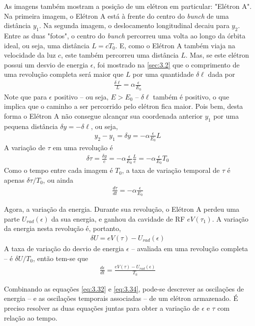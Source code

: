 As imagens também mostram a posição de um elétron em particular: "Elétron A". Na primeira imagem, o Elétron A está à frente do centro do \textit{bunch} de uma distância $y_1$. Na segunda imagem, o deslocamento longitudinal decaiu para $y_2$. Entre as duas "fotos", o centro do \textit{bunch} percorreu uma volta ao longo da órbita ideal, ou seja, uma distância $L=cT_0$. E, como o Elétron A também viaja na velocidade da luz $c$, este também percorreu uma distância $L$. Mas, se este elétron possui um desvio de energia $\epsilon$, foi mostrado na \autoref{sec:3.2} que o comprimento de uma revolução completa será maior que $L$ por uma quantidade $\delta \ell$ dada por
\begin{align}
	\frac{\delta \ell}{L} = \alpha\frac{\epsilon}{E_0}
\end{align}
Note que para $\epsilon$ positivo -- ou seja, $E>E_0$ -- $\delta \ell$ também é positivo, o que implica que o caminho a ser percorrido pelo elétron fica maior. Pois bem, desta forma o Elétron A não consegue alcançar sua coordenada anterior $y_1$ por uma pequena distância $\delta y = -\delta \ell$, ou seja,
\begin{align}
	y_2 - y_1 = \delta y = -\alpha \frac{\epsilon}{E_0}L
\end{align}
A variação de $\tau$ em uma revolução é
\begin{align}
	\delta \tau = \frac{\delta y}{c} = -\alpha \frac{\epsilon}{E_0}\frac{L}{c} = -\alpha\frac{\epsilon}{E_0}T_0
\end{align}
Como o tempo entre cada imagem é $T_0$, a taxa de variação temporal de $\tau$ é apenas $\delta \tau/T_0$, ou ainda
\begin{align}
	\frac{d \tau}{dt} = -\alpha \frac{\epsilon}{E_0}\label{eq:3.32}
\end{align}

Agora, a variação da energia. Durante sua revolução, o Elétron A perdeu uma parte $U_{rad}(\epsilon)$ da sua energia, e ganhou da cavidade de RF $eV(\tau_1)$. A variação da energia nesta revolução é, portanto,
\begin{align}
	\delta U = eV(\tau)-U_{rad}(\epsilon)
\end{align}
A taxa de variação do desvio de energia $\epsilon$ -- avaliada em uma revolução completa -- é $\delta U/T_0$, então tem-se que
\begin{align}
	\frac{d\epsilon}{dt} = \frac{eV(\tau)-U_{rad}(\epsilon)}{T_0}\label{eq:3.34}
\end{align}

Combinando as equações \eqref{eq:3.32} e \eqref{eq:3.34}, pode-se descrever as oscilações de energia -- e as oscilações temporais associadas --  de um elétron armazenado. É preciso resolver as duas equações juntas para obter a variação de $\epsilon$ e $\tau$ com relação ao tempo.

